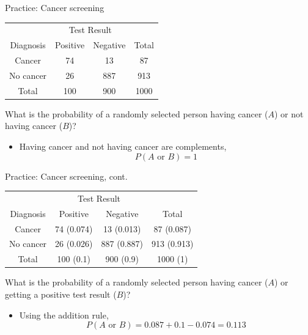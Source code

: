 \documentclass[xcolor=table, handout]{beamer}
\begin{document}
\begin{frame}{Practice: Cancer screening}
\begin{block}{}
{\centering
\begin{tabular}{c | c  c | c}
\multicolumn{1}{c}{} & \multicolumn{2}{c}{Test Result}\\
Diagnosis & Positive & Negative & Total \\
\hline
Cancer & 74 & 13 & 87\\
No cancer & 26 & 887 & 913\\
\hline
Total & 100 & 900 & 1000
\end{tabular}\par
}
\end{block}

\begin{exampleblock}{}
What is the probability of a randomly selected person having cancer ($A$) or not having cancer ($B$)?

\begin{itemize}
\pause
\item Having cancer and not having cancer are complements,
\[ P(A \text{ or } B) = 1\]
\end{itemize}
\end{exampleblock}
\end{frame}

\begin{frame}{Practice: Cancer screening, cont.}
\begin{block}{}
{\centering
\begin{tabular}{c | c  c | c}
\multicolumn{1}{c}{} & \multicolumn{2}{c}{Test Result}\\
Diagnosis & Positive & Negative & Total \\
\hline
Cancer & 74 (0.074) & 13 (0.013) & 87 (0.087)\\
No cancer & 26 (0.026) & 887 (0.887) & 913 (0.913)\\
\hline
Total & 100 (0.1) & 900 (0.9) & 1000 (1)
\end{tabular}\par
}
\end{block}

\begin{exampleblock}{}
What is the probability of a randomly selected person having cancer ($A$) or getting a positive test result ($B$)?

\begin{itemize}
\pause
\item Using the addition rule,
\[ P(A \text{ or } B) = 0.087 + 0.1 - 0.074 = 0.113\]
\end{itemize}
\end{exampleblock}
\end{frame}
\end{document}
